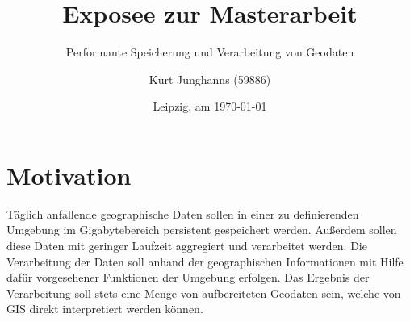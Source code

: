 \documentclass[
a4paper,     %
12pt         %
]{scrartcl}  %
\title{Exposee zur Masterarbeit}
\subtitle{Performante Speicherung und Verarbeitung von Geodaten}
\author{Kurt Junghanns (59886)}
\date{Leipzig, am \today{}}
\begin{document}

 \maketitle

 \tableofcontents







\section{Motivation}

Täglich anfallende geographische Daten sollen in einer zu definierenden Umgebung im Gigabytebereich persistent gespeichert werden.
Außerdem sollen diese Daten mit geringer Laufzeit aggregiert und verarbeitet werden.
Die Verarbeitung der Daten soll anhand der geographischen Informationen mit Hilfe dafür vorgesehener Funktionen der Umgebung erfolgen.
Das Ergebnis der Verarbeitung soll stets eine Menge von aufbereiteten Geodaten sein, welche von GIS direkt interpretiert werden können.
\end{document}
